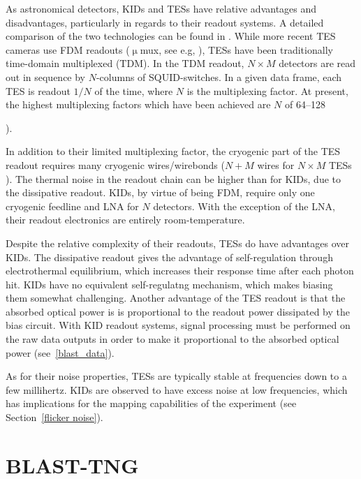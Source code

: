 As astronomical detectors, KIDs and TESs have relative advantages and disadvantages, particularly in regards to their readout systems. A detailed comparison of the two technologies can be found in \citet{mauskopf2018transition}. While more recent TES cameras use FDM readouts ($\upmu$mux, see e.g, \citet{stanchfield2016development}), TESs have been traditionally time-domain multiplexed (TDM). In the TDM readout, $N \times M$ detectors are read out in sequence by $N$-columns of SQUID-switches. In a given data frame, each TES is readout $1/N$ of the time, where $N$ is the multiplexing factor. At present, the highest multiplexing factors which have been achieved are $N$ of 64--128 {\citet{henderson2016advanced,mates2017simultaneous}).

In addition to their limited multiplexing factor, the cryogenic part of the TES readout requires many cryogenic wires/wirebonds ($N + M$ wires for $N \times M$ TESs \citep{mauskopf2018transition}). The thermal noise in the readout chain can be higher than for KIDs, due to the dissipative readout. KIDs, by virtue of being FDM, require only one cryogenic feedline and LNA for $N$ detectors. With the exception of the LNA, their readout electronics are entirely room-temperature.

Despite the relative complexity of their readouts, TESs do have advantages over KIDs. The dissipative readout gives the advantage of self-regulation through electrothermal equilibrium, which increases their response time after each photon hit. KIDs have no equivalent self-regulatng mechanism, which makes biasing them somewhat challenging. Another advantage of the TES readout is that the absorbed optical power is is proportional to the readout power dissipated by the bias circuit. With KID readout systems, signal processing must be performed on the raw data outputs in order to make it proportional to the absorbed optical power (see~\ref{blast_data}).

As for their noise properties, TESs are typically stable at frequencies down to a few millihertz. KIDs are observed to have excess noise at low frequencies, which has implications for the mapping capabilities of the experiment (see Section~\ref{flicker noise}).

\section{BLAST-TNG}\label{blast}

}
